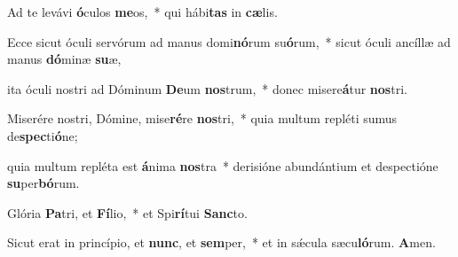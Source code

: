 \item Ad te levávi \textbf{ó}culos \textbf{me}os,~* qui hábi\textbf{tas} in \textbf{cæ}lis.

\item Ecce sicut óculi servórum ad manus domi\textbf{nó}rum su\textbf{ó}rum,~* sicut óculi ancíllæ ad manus \textbf{dó}minæ \textbf{su}æ,

\item ita óculi nostri ad Dóminum \textbf{De}um \textbf{nos}trum,~* donec misere\textbf{á}tur \textbf{nos}tri.

\item Miserére nostri, Dómine, mise\textbf{ré}re \textbf{nos}tri,~* quia multum repléti sumus de\textbf{spec}ti\textbf{ó}ne;

\item quia multum repléta est \textbf{á}nima \textbf{nos}tra~* derisióne abundántium et despectióne \textbf{su}per\textbf{bó}rum.

\item Glória \textbf{Pa}tri, et \textbf{Fí}lio,~* et Spi\textbf{rí}tui \textbf{Sanc}to.

\item Sicut erat in princípio, et \textbf{nunc}, et \textbf{sem}per,~* et in sǽcula sæcu\textbf{ló}rum. \textbf{A}men.